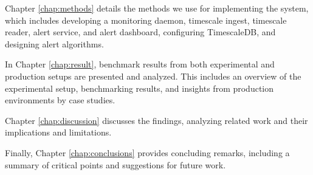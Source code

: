Chapter \ref{chap:methods} details the methods we use for implementing the system, which includes developing a monitoring daemon, timescale ingest, timescale reader, alert service, and alert dashboard, configuring TimescaleDB, and designing alert algorithms.

In Chapter \ref{chap:result}, benchmark results from both experimental and production setups are presented and analyzed. This includes an overview of the experimental setup, benchmarking results, and insights from production environments by case studies.

Chapter \ref{chap:discussion} discusses the findings, analyzing related work and their implications and limitations.

Finally, Chapter \ref{chap:conclusions} provides concluding remarks, including a summary of critical points and suggestions for future work.
